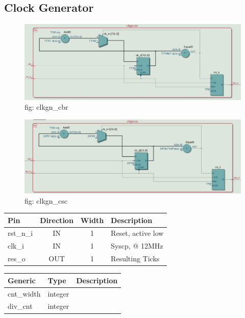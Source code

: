 \documentclass[12pt,a4 paper] {report}
\begin{document}
\subsection{Clock Generator}
\begin{figure}[h]
	\centering	
	\includegraphics[scale=0.2]{../png/clkgn_cbr.png}
	\newline
	fig: clkgn\_cbr\\
\end{figure}
\begin{figure}[h]
	\centering	
	\includegraphics[scale=0.2]{../png/clkgn_csc.png}
	\newline
	fig: clkgn\_csc\\
\end{figure}
\begin{center}
	\begin{tabular}{ | p{2cm} | c | c | p{5cm} |}
		\hline
		\textbf{Pin} & \textbf{Direction} & \textbf{Width} & \textbf{Description} \\
		\hline	
  	rst\_n\_i & IN & 1 & Reset, active low \\
  	\hline
		clk\_i & IN & 1 & Syscp, @ 12MHz \\
		\hline
		res\_o & OUT & 1 & Resulting Ticks \\
		\hline
		
	\end{tabular}
\end{center}
\begin{center}
	\begin{tabular}{| p{2cm} | p{2cm} | p{4cm} |}
	\hline
	\textbf{Generic} & \textbf{Type} & \textbf{Description} \\
	\hline
	cnt\_width & integer & \\
	\hline
	div\_cnt & integer & \\	
	\hline
	\end{tabular}	
\end{center}
\end{document}
